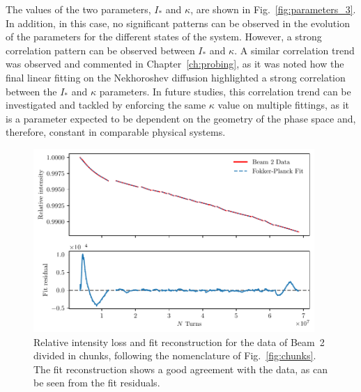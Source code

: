 The values of the two parameters, $I_\ast$ and $\kappa$, are shown in Fig.~\ref{fig:parameters_3}. In addition, in this case, no significant patterns can be observed in the evolution of the parameters for the different states of the system. However, a strong correlation pattern can be observed between $I_\ast$ and $\kappa$. A similar correlation trend was observed and commented in Chapter~\ref{ch:probing}, as it was noted how the final linear fitting on the Nekhoroshev diffusion highlighted a strong correlation between the $I_\ast$ and $\kappa$ parameters. In future studies, this correlation trend can be investigated and tackled by enforcing the same $\kappa$ value on multiple fittings, as it is a parameter expected to be dependent on the geometry of the phase space and, therefore, constant in comparable physical systems. 


\begin{figure}[ht]
    \centering
    \includegraphics[width=0.95\textwidth]{5_wire_compensators_LHC/figs/losses_b2.pdf}
    \caption{Relative intensity loss and fit reconstruction for the data of Beam~2 divided in chunks, following the nomenclature of Fig.~\ref{fig:chunks}. 
    The fit reconstruction shows a good agreement with the data, as can be seen from the fit residuals.}
    \label{fig:reconstruction_4}
\end{figure}

